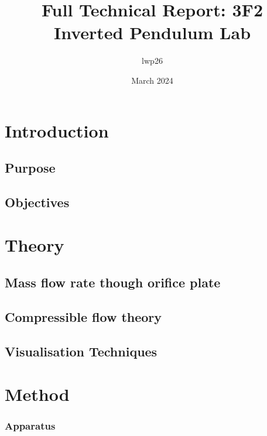 \documentclass{article}
\begin{document}
\title{Full Technical Report: 3F2 Inverted Pendulum Lab}
\author{lwp26}
\date{March 2024}
\maketitle

\begin{abstract}
    \centering

\end{abstract}

\newpage

\section{Introduction}

\subsection{Purpose}

\subsection{Objectives}

\section{Theory}

\subsection{Mass flow rate though orifice plate}


\subsection{Compressible flow theory}

\subsection{Visualisation Techniques}


\section{Method}

\subsubsection{Apparatus}
\end{document}
